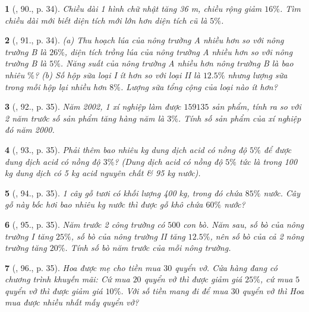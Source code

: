 \documentclass{article}
\newtheorem{baitoan}{}
\begin{document}
\begin{baitoan}[\cite{Binh_Toan_6_tap_2}, 90., p. 34]
	Chiều dài 1 hình chữ nhật tăng {\rm36 m}, chiều rộng giảm $16\%$. Tìm chiều dài mới biết diện tích mới lớn hơn diện tích cũ là $5\%$.
\end{baitoan}

\begin{baitoan}[\cite{Binh_Toan_6_tap_2}, 91., p. 34]
	(a) Thu hoạch lúa của nông trường A nhiều hơn so với nông trường B là $26\%$, diện tích trồng lúa của nông trường A nhiều hơn so với nông trường B là $5\%$. Năng suất của nông trường A nhiều hơn nông trường B là bao nhiêu $\%$? (b) Số hộp sữa loại I ít hơn so với loại II là $12.5\%$ nhưng lượng sữa trong mỗi hộp lại nhiều hơn $8\%$. Lượng sữa tổng cộng của loại nào ít hơn?
\end{baitoan}

\begin{baitoan}[\cite{Binh_Toan_6_tap_2}, 92., p. 35]
	Năm 2002, 1 xí nghiệp làm được $159135$ sản phẩm, tính ra so với 2 năm trước số sản phẩm tăng hàng năm là $3\%$. Tính số sản phẩm của xí nghiệp đó năm 2000.
\end{baitoan}

\begin{baitoan}[\cite{Binh_Toan_6_tap_2}, 93., p. 35]
	Phải thêm bao nhiêu {\rm kg} dung dịch acid có nồng độ $5\%$ để được dung dịch acid có nồng độ $3\%$? (Dung dịch acid có nồng độ $5\%$ tức là trong {\rm100 kg} dung dịch có {\rm5 kg} acid nguyên chất \& {\rm95 kg} nước).
\end{baitoan}

\begin{baitoan}[\cite{Binh_Toan_6_tap_2}, 94., p. 35]
	1 cây gỗ tươi có khối lượng {\rm400 kg}, trong đó chứa $85\%$ nước. Cây gỗ này bốc hơi bao nhiêu {\rm kg} nước thì được gỗ khô chứa $60\%$ nước?
\end{baitoan}

\begin{baitoan}[\cite{Binh_Toan_6_tap_2}, 95., p. 35]
	Năm trước 2 công trường có $500$ con bò. Năm sau, số bò của nông trường I tăng $25\%$, số bò của nông trường II tăng $12.5\%$, nên số bò của cả 2 nông trường tăng $20\%$. Tính số bò năm trước của mỗi nông trường.
\end{baitoan}

\begin{baitoan}[\cite{Binh_Toan_6_tap_2}, 96., p. 35]
	Hoa được mẹ cho tiền mua $30$ quyển vở. Cửa hàng đang có chương trình khuyến mãi: Cứ mua $20$ quyển vở thì được giảm giá $25\%$, cứ mua $5$ quyển vở thì được giảm giá $10\%$. Với số tiền mang đi để mua $30$ quyển vở thì Hoa mua được nhiều nhất mấy quyển vở?
\end{baitoan}
\end{document}
